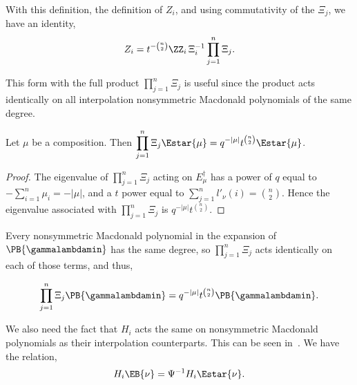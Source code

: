 With this definition, the definition of $Z_i$, and using commutativity of the $\Xi_j$, we have an identity,
\[ Z_i = t^{-\binom{n}{2}} \ZZ_i\, \Xi_i^{-1} \prod_{j=1}^n \Xi_j. \]

This form with the full product $\displaystyle{\prod_{j=1}^n \Xi_j}$ is useful since the product acts identically on all interpolation nonsymmetric Macdonald polynomials of the same degree.

\begin{lemm}
Let $\mu$ be a composition. Then $\displaystyle{\prod_{j=1}^n \Xi_j \Estar{\mu} = q^{-|\mu|} t^{\binom{n}{2}} \Estar{\mu}}$.
\end{lemm} \begin{proof} The eigenvalue of $\displaystyle{\prod_{j=1}^n \Xi_j}$ acting on $E^\dagger_{\mu}$ has a power of $q$ equal to $\displaystyle{-\sum_{i=1}^n \mu_i} = -|\mu|$, and a $t$ power equal to $\displaystyle{\sum_{j=1}^n l'_\nu(i) = \binom{n}{2}}$. Hence the eigenvalue associated with $\displaystyle{\prod_{j=1}^n \Xi_j}$ is $q^{-|\mu|} t^{\binom{n}{2}}$.
\qedhere
\end{proof}


Every nonsymmetric Macdonald polynomial in the expansion of $\PB{\gammalambdamin}$ has the same degree, so $\displaystyle{\prod_{j=1}^n \Xi_j}$ acts identically on each of those terms, and thus,


\[ \prod_{j=1}^n \Xi_j \PB{\gammalambdamin} = q^{-|\mu|}t^{\binom{n}{2}} \PB{\gammalambdamin}.\]

We also need the fact that $H_i$ acts the same on nonsymmetric Macdonald polynomials as their interpolation counterparts. This can be seen in~\cite[page 6]{MR2534801}. We have the relation,
\begin{equation}\label{Tiactthesame} H_i \EB{\nu} = \Psi^{-1} H_i \Estar{\nu} .\end{equation}

